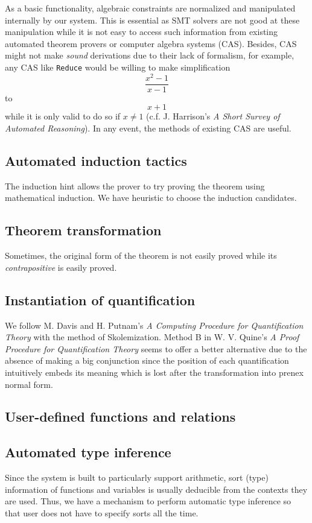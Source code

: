 \documentclass[12pt]{article}
\begin{document}
As a basic functionality, algebraic constraints are normalized and manipulated internally by our system. This is essential as SMT solvers are not good at these manipulation while it is not easy to access such information from existing automated theorem provers  or computer algebra systems (CAS). Besides, CAS might not make \emph{sound} derivations due to their lack of formalism, for example, any CAS like \texttt{Reduce} would be willing to make simplification
$$\frac{x^2-1}{x-1}$$
to
$$x+1$$
while it is only valid to do so if $x \not= 1$ (c.f. J. Harrison's \emph{A Short Survey of Automated Reasoning}). In any event, the methods of existing CAS are useful.

\subsection{Automated induction tactics}

The induction hint allows the prover to try proving the theorem using mathematical induction. We have heuristic to choose the induction candidates.

\subsection{Theorem transformation}

Sometimes, the original form of the theorem is not easily proved while its \emph{contrapositive} is easily proved.

\subsection{Instantiation of quantification}

We follow M. Davis and H. Putnam's \emph{A Computing Procedure for Quantification Theory} with the method of Skolemization. Method B in W. V. Quine's \emph{A Proof Procedure for Quantification Theory} seems to offer a better alternative due to the absence of making a big conjunction since the position of each quantification intuitively embeds its meaning which is lost after the transformation into prenex normal form.

\subsection{User-defined functions and relations}

\subsection{Automated type inference}


Since the system is built to particularly support arithmetic, sort (type) information of functions and variables is usually deducible from the contexts they are used. Thus, we have a mechanism to perform automatic type inference so that user does not have to specify sorts all the time.

\end{document}
